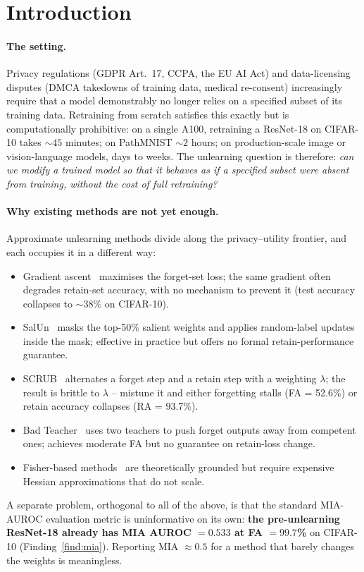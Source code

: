 \documentclass{article}
\newcommand{\new}[1]{{\color{orange}#1}}
\begin{document}
\section{Introduction}\label{sec:intro}

\new{
\paragraph{The setting.} Privacy regulations (GDPR Art.~17, CCPA, the EU AI Act) and data-licensing disputes (DMCA takedowns of training data, medical re-consent) increasingly require that a model demonstrably no longer relies on a specified subset of its training data. Retraining from scratch satisfies this exactly but is computationally prohibitive: on a single A100, retraining a ResNet-18 on CIFAR-10 takes $\sim 45$ minutes; on PathMNIST $\sim 2$ hours; on production-scale image or vision-language models, days to weeks. The unlearning question is therefore: \emph{can we modify a trained model so that it behaves as if a specified subset were absent from training, without the cost of full retraining?}

\paragraph{Why existing methods are not yet enough.} Approximate unlearning methods divide along the privacy--utility frontier, and each occupies it in a different way:
\begin{itemize}[nosep,leftmargin=*]
\item Gradient ascent~\cite{thudi2022unrolling} maximises the forget-set loss; the same gradient often degrades retain-set accuracy, with no mechanism to prevent it (test accuracy collapses to $\sim 38$\% on CIFAR-10).
\item SalUn~\cite{fan2024salun} masks the top-50\% salient weights and applies random-label updates inside the mask; effective in practice but offers no formal retain-performance guarantee.
\item SCRUB~\cite{kurmanji2023unbounded} alternates a forget step and a retain step with a weighting $\lambda$; the result is brittle to $\lambda$ -- mistune it and either forgetting stalls (FA = 52.6\%) or retain accuracy collapses (RA = 93.7\%).
\item Bad Teacher~\cite{chundawat2023badteacher} uses two teachers to push forget outputs away from competent ones; achieves moderate FA but no guarantee on retain-loss change.
\item Fisher-based methods~\cite{golatkar2021scrubbing} are theoretically grounded but require expensive Hessian approximations that do not scale.
\end{itemize}
A separate problem, orthogonal to all of the above, is that the standard MIA-AUROC evaluation metric is uninformative on its own: \textbf{the pre-unlearning ResNet-18 already has MIA AUROC $= 0.533$ at FA $= 99.7$\%} on CIFAR-10 (Finding~\ref{find:mia}). Reporting MIA $\approx 0.5$ for a method that barely changes the weights is meaningless.

}
\end{document}

